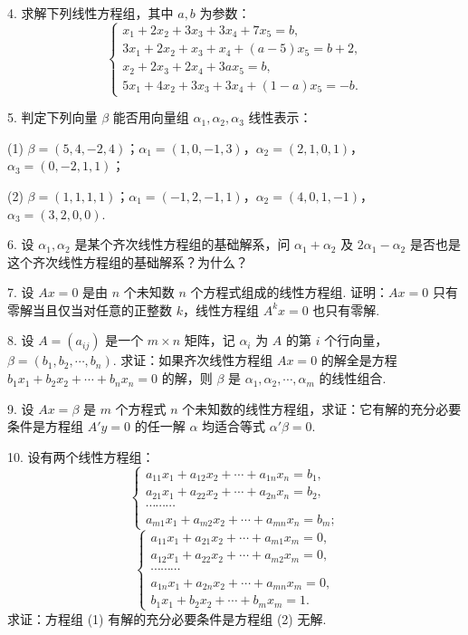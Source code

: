 \documentclass[UTF8,12pt,a4paper,fontset=fandol]{ctexart}
\begin{document}
4. 求解下列线性方程组，其中 $a,b$ 为参数：
\[
\left\{\begin{array}{r}
x_1+2x_2+3x_3+3x_4+7x_5=b,\\
3x_1+2x_2+x_3+x_4+(a-5)x_5=b+2,\\
x_2+2x_3+2x_4+3ax_5=b,\\
5x_1+4x_2+3x_3+3x_4+(1-a)x_5=-b.
\end{array}\right.
\]

5. 判定下列向量 $\beta$ 能否用向量组 $\alpha_1,\alpha_2,\alpha_3$ 线性表示：

(1) $\beta=(5,4,-2,4)$；$\alpha_1=(1,0,-1,3)$，$\alpha_2=(2,1,0,1)$，$\alpha_3=(0,-2,1,1)$；

(2) $\beta=(1,1,1,1)$；$\alpha_1=(-1,2,-1,1)$，$\alpha_2=(4,0,1,-1)$，$\alpha_3=(3,2,0,0)$.

6. 设 $\alpha_1,\alpha_2$ 是某个齐次线性方程组的基础解系，问 $\alpha_1+\alpha_2$ 及 $2\alpha_1-\alpha_2$ 是否也是这个齐次线性方程组的基础解系？为什么？

7. 设 $Ax=0$ 是由 $n$ 个未知数 $n$ 个方程式组成的线性方程组. 证明：$Ax=0$ 只有零解当且仅当对任意的正整数 $k$，线性方程组 $A^kx=0$ 也只有零解.

8. 设 $A=(a_{ij})$ 是一个 $m\times n$ 矩阵，记 $\alpha_i$ 为 $A$ 的第 $i$ 个行向量，$\beta=(b_1,b_2,\cdots,b_n)$. 求证：如果齐次线性方程组 $Ax=0$ 的解全是方程 $b_1x_1+b_2x_2+\cdots+b_nx_n=0$ 的解，则 $\beta$ 是 $\alpha_1,\alpha_2,\cdots,\alpha_m$ 的线性组合.

9. 设 $Ax=\beta$ 是 $m$ 个方程式 $n$ 个未知数的线性方程组，求证：它有解的充分必要条件是方程组 $A'y=0$ 的任一解 $\alpha$ 均适合等式 $\alpha'\beta=0$.

10. 设有两个线性方程组：
\[
\left\{\begin{array}{c}
a_{11}x_1+a_{12}x_2+\cdots+a_{1n}x_n=b_1,\\
a_{21}x_1+a_{22}x_2+\cdots+a_{2n}x_n=b_2,\\
\cdots\cdots\cdots\\
a_{m1}x_1+a_{m2}x_2+\cdots+a_{mn}x_n=b_m;
\end{array}\right.
\tag{1}
\]
\[
\left\{\begin{array}{c}
a_{11}x_1+a_{21}x_2+\cdots+a_{m1}x_m=0,\\
a_{12}x_1+a_{22}x_2+\cdots+a_{m2}x_m=0,\\
\cdots\cdots\cdots\\
a_{1n}x_1+a_{2n}x_2+\cdots+a_{mn}x_m=0,\\
b_1x_1+b_2x_2+\cdots+b_mx_m=1.
\end{array}\right.
\tag{2}
\]
求证：方程组 (1) 有解的充分必要条件是方程组 (2) 无解.
\end{document}
